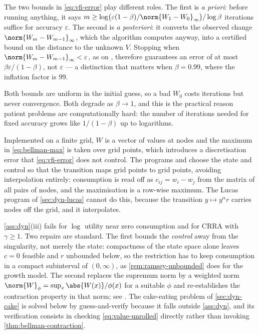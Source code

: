 \begin{remark}\label{rem:vfi}
	The two bounds in \eqref{eq:vfi-error} play different roles. The first is
	\emph{a priori}: before running anything, it says $m\geq\log\bigl(\varepsilon
		(1-\beta)/\norm{W_1-W_0}_\infty\bigr)/\log\beta$ iterations suffice for accuracy
	$\varepsilon$. The second is \emph{a posteriori}: it converts the observed
	change $\norm{W_m-W_{m-1}}_\infty$, which the algorithm computes anyway, into a
	certified bound on the distance to the unknown $V$. Stopping when
	$\norm{W_m-W_{m-1}}_\infty<\varepsilon$, as on
	\autocite[slides 14--16]{fukuda2026dynamic}, therefore guarantees an error of at
	most $\beta\varepsilon/(1-\beta)$, not $\varepsilon$ --- a distinction that
	matters when $\beta=0.99$, where the inflation factor is $99$.

	Both bounds are uniform in the initial guess, so a bad $W_0$ costs iterations
	but never convergence. Both degrade as $\beta\to1$, and this is the practical
	reason patient problems are computationally hard: the number of iterations
	needed for fixed accuracy grows like $1/(1-\beta)$ up to logarithms.

	Implemented on a finite grid, $W$ is a vector of values at nodes and the maximum
	in \eqref{eq:bellman-max} is taken over grid points, which introduces a
	discretisation error that \eqref{eq:vfi-error} does not control. The
	programs  and  choose the
	state and control so that the transition maps grid points to grid points,
	avoiding interpolation entirely: consumption is read off as
	$c_{ij}=w_i-w_j$ from the matrix of all pairs of nodes, and the maximisation
	is a row-wise maximum. The Lucas program of \autoref{sec:dyn-lucas} cannot do
	this, because the transition $y\mapsto y^{\alpha}r$ carries nodes off the grid,
	and it interpolates.
\end{remark}


\begin{remark}\label{rem:unbounded-returns}
	\autoref{ass:dyn}(iii) fails for $\log$ utility near zero consumption and for
	CRRA with $\gamma\geq1$. Two repairs are standard. The first bounds the
	\emph{control} away from the singularity, not merely the state: compactness of
	the state space alone leaves $c=0$ feasible and $r$ unbounded below, so the
	restriction has to keep consumption in a compact subinterval of $(0,\infty)$,
	as \autoref{rem:ramsey-unbounded} does for the growth model. The second
	replaces the
	supremum norm by a weighted norm $\norm{W}_\phi=\sup_x\abs{W(x)}/\phi(x)$ for a
	suitable $\phi$ and re-establishes the contraction property in that norm; see
	\textcite[Ch.~4]{stokey1989recursive}. The cake-eating problem of
	\autoref{sec:dyn-cake} is solved below by guess-and-verify because it
	falls outside \autoref{ass:dyn}, and its verification consists in checking
	\eqref{eq:value-unrolled} directly rather than invoking
	\autoref{thm:bellman-contraction}.
\end{remark}

